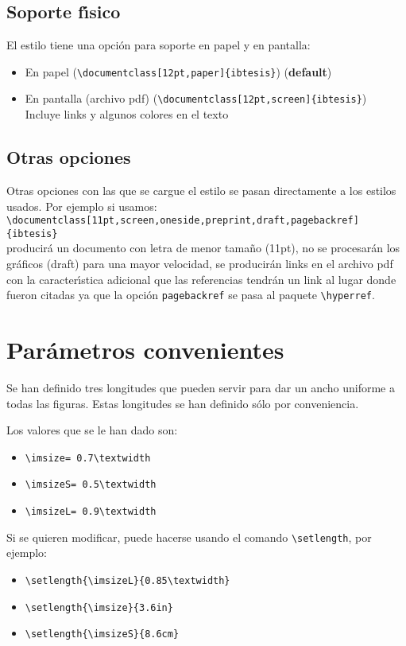 \subsection*{Soporte f\'{\i}sico}

El estilo tiene una opci\'{o}n para soporte en papel y en pantalla:
\begin{itemize}
\item En papel (\verb|\documentclass[12pt,paper]{ibtesis}|) (\textbf{default})
\item En pantalla (archivo pdf) (\verb|\documentclass[12pt,screen]{ibtesis}|)\\
Incluye links y algunos colores en el texto
\end{itemize}

\subsection*{Otras opciones}
\label{S:otras-opciones}
Otras opciones con las que se cargue el estilo se pasan directamente a los estilos usados. Por ejemplo si usamos:\\
\verb|\documentclass[11pt,screen,oneside,preprint,draft,pagebackref]{ibtesis}|\\
producir\'{a} un documento con letra de menor tama\~{n}o (11pt), no se procesar\'{a}n los gr\'{a}ficos (draft) para una mayor velocidad, se producir\'{a}n links en el archivo pdf con la caracter\'{\i}stica adicional que las referencias tendr\'{a}n un link al lugar donde fueron citadas ya que la opci\'{o}n \verb|pagebackref| se pasa al paquete \verb|\hyperref|.

\section{Par\'{a}metros convenientes}
\label{S:param-conv}

Se han definido tres longitudes que pueden servir para dar un ancho uniforme a todas las figuras.
Estas longitudes se han definido s\'{o}lo por conveniencia. 

Los valores que se le han dado son:
\begin{itemize}
\item \verb|\imsize= 0.7\textwidth|
\item \verb|\imsizeS= 0.5\textwidth|
\item \verb|\imsizeL= 0.9\textwidth|
\end{itemize}

Si se quieren modificar, puede hacerse usando el comando \verb|\setlength|, por ejemplo:
\begin{itemize}
\item \verb|\setlength{\imsizeL}{0.85\textwidth}|
\item \verb|\setlength{\imsize}{3.6in}|
\item \verb|\setlength{\imsizeS}{8.6cm}|
\end{itemize}

